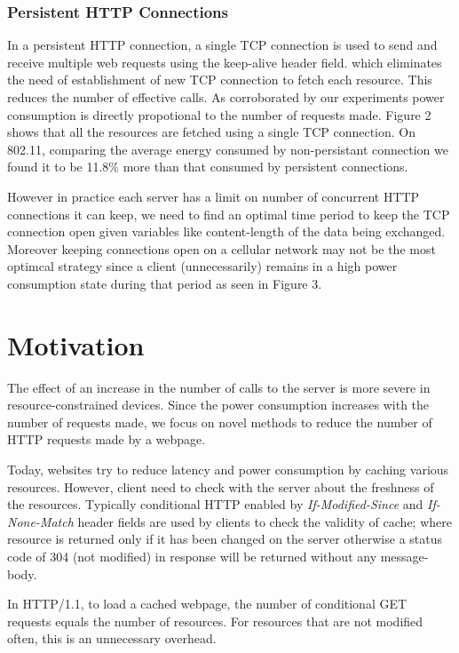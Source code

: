 \documentclass{sigplanconf}
\begin{document}
\subsubsection{Persistent HTTP Connections}

In a persistent HTTP connection, a single TCP connection is used to send and receive multiple web requests using the keep-alive header field. which eliminates the need of establishment of new TCP connection to fetch each resource. This reduces the number of effective calls. As corroborated by our experiments power consumption is directly propotional to the number of requests made. Figure 2 shows that all the resources are fetched using a single TCP connection. On 802.11, comparing the average energy consumed by non-persistant connection we found it to be 11.8\% more than that consumed by persistent connections.

However in practice each server has a limit on number of concurrent HTTP connections it can keep, we need to find an optimal time period to keep the TCP connection open given variables like content-length of the data being exchanged. Moreover keeping connections open on a cellular network may not be the most optimcal strategy since a client (unnecessarily) remains in a high power consumption state during that period as seen in Figure 3. 

\section{Motivation}
The effect of an increase in the number of calls to the server is more severe in resource-constrained devices. Since the power consumption increases with the number of requests made, we focus on novel methods to reduce the number of HTTP requests made by a webpage.

Today, websites try to reduce latency and power consumption by caching various resources. However, client need to check with the server about the freshness of the resources. Typically conditional HTTP enabled by {\it If-Modified-Since} and {\it If-None-Match} header fields are used by clients to check the validity of cache; where resource is returned only if it has been changed on the server otherwise a status code of 304 (not modified) in response will be returned without any message-body. 

In HTTP/1.1, to load a cached webpage, the number of conditional GET requests equals the number of resources. For resources that are not modified often, this is an unnecessary overhead.
\end{document}
